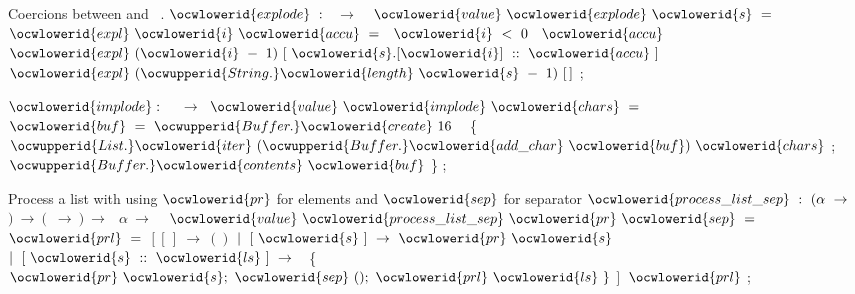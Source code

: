 \documentclass[12pt]{article}
\begin{document}
\ocwendcode{}\ocwindent{0.00em}
Coercions between \ocwbegindcode{}\ocwenddcode{} and \ocwbegindcode{}~\ocwenddcode{}. 
\ocweol
\ocwindent{0.00em}
\ocwbegindcode{}$\ocwlowerid{explode}~:~$~$\rightarrow{}~$~\ocwenddcode{}             
\ocweol
\label{../ML/list2.ml:4349}%
\medskip
\ocwbegincode{}\ocwindent{0.00em}
$\ocwlowerid{value}~\ocwlowerid{explode}~\ocwlowerid{s}~=$\ocweol
\ocwindent{1.00em}
~~$\ocwlowerid{expl}~\ocwlowerid{i}~\ocwlowerid{accu}~=$\ocweol
\ocwindent{2.00em}
~$\ocwlowerid{i}~<~0~$~$\ocwlowerid{accu}~$~$\ocwlowerid{expl}~(\ocwlowerid{i}~-~1)~[~\ocwlowerid{s}.[\ocwlowerid{i}]~::~\ocwlowerid{accu}~]~$\ocweol
\ocwindent{1.00em}
$\ocwlowerid{expl}~(\ocwupperid{String.}\ocwlowerid{length}~\ocwlowerid{s}~-~1)~[\,]$\ocweol
\ocwindent{0.00em}
;\medskip

\ocwendcode{}\ocwindent{0.00em}
\ocwbegindcode{}$\ocwlowerid{implode}:~$~~$\rightarrow{}~$\ocwenddcode{} 
\ocweol
\label{../ML/list2.ml:4525}%
\medskip
\ocwbegincode{}\ocwindent{0.00em}
$\ocwlowerid{value}~\ocwlowerid{implode}~\ocwlowerid{chars}~=~$\ocweol
\ocwindent{1.00em}
~$\ocwlowerid{buf}~=~\ocwupperid{Buffer.}\ocwlowerid{create}~16~$~\ocweol
\ocwindent{1.00em}
\{~$\ocwupperid{List.}\ocwlowerid{iter}~(\ocwupperid{Buffer.}\ocwlowerid{add\_char}~\ocwlowerid{buf})~\ocwlowerid{chars}$\ocweol
\ocwindent{1.00em}
;~$\ocwupperid{Buffer.}\ocwlowerid{contents}~\ocwlowerid{buf}$\ocweol
\ocwindent{1.00em}
\}\ocweol
\ocwindent{0.00em}
;\medskip

\ocwendcode{}\ocwindent{0.00em}
Process a list with using \ocwbegindcode{}$\ocwlowerid{pr}$\ocwenddcode{} for elements and \ocwbegindcode{}$\ocwlowerid{sep}$\ocwenddcode{} for separator     
\ocweol
\ocwindent{0.00em}
\ocwbegindcode{}$\ocwlowerid{process\_list\_sep}~:~(\alpha{}~\rightarrow{}~$$)~\rightarrow{}~($~$\rightarrow{}~$$)~\rightarrow{}~$~$\alpha{}~\rightarrow{}~$~\ocwenddcode{} 
\ocweol
\label{../ML/list2.ml:4812}%
\medskip
\ocwbegincode{}\ocwindent{0.00em}
$\ocwlowerid{value}~\ocwlowerid{process\_list\_sep}~\ocwlowerid{pr}~\ocwlowerid{sep}~=~$\ocweol
\ocwindent{1.00em}
~~$\ocwlowerid{prl}~=~$\ocweol
\ocwindent{2.50em}
$[~[\,]~\rightarrow{}~()$\ocweol
\ocwindent{2.50em}
$\mid{}~[~\ocwlowerid{s}~]~\rightarrow{}~\ocwlowerid{pr}~\ocwlowerid{s}$\ocweol
\ocwindent{2.50em}
$\mid{}~[~\ocwlowerid{s}~::~\ocwlowerid{ls}~]~\rightarrow{}~$~\{~$\ocwlowerid{pr}~\ocwlowerid{s};~\ocwlowerid{sep}~();~\ocwlowerid{prl}~\ocwlowerid{ls}~\}$\ocweol
\ocwindent{2.50em}
$]~$\ocweol
\ocwindent{1.00em}
$\ocwlowerid{prl}$\ocweol
\ocwindent{0.00em}
;\medskip
\end{document}
